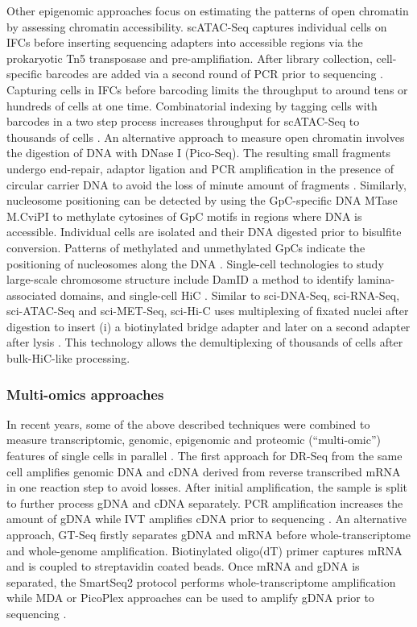 Other epigenomic approaches focus on estimating the patterns of open chromatin by assessing chromatin accessibility. \Gls{scATAC-Seq} captures individual cells on \glspl{IFC} before inserting sequencing adapters into accessible regions via the prokaryotic Tn5 transposase and pre-amplifiation. After library collection, cell-specific barcodes are added via a second round of PCR prior to sequencing \citep{Buenrostro2015}.  Capturing cells in IFCs before barcoding limits the throughput to around tens or hundreds of cells at one time. Combinatorial indexing by tagging cells with barcodes in a two step process increases throughput for scATAC-Seq to thousands of cells \citep{Cusanovich2015}. An alternative approach to measure open chromatin involves the digestion of DNA with DNase I (Pico-Seq). The resulting small fragments undergo end-repair, adaptor ligation and PCR amplification in the presence of circular carrier DNA to avoid the loss of minute amount of fragments \citep{Jin2015}. Similarly, nucleosome positioning can be detected by using the GpC-specific DNA \gls{MTase} M.CviPI to methylate cytosines of GpC motifs in regions where DNA is accessible. Individual cells are isolated and their DNA digested prior to bisulfite conversion. Patterns of methylated and unmethylated GpCs indicate the positioning of nucleosomes along the DNA \citep{Small2014}.
Single-cell technologies to study large-scale chromosome structure include \gls{DamID} \citep{Kind2015} a method to identify lamina-associated domains, and single-cell \gls{HiC} \citep{Nagano2013}. Similar to sci-DNA-Seq, sci-RNA-Seq, sci-ATAC-Seq and sci-MET-Seq, sci-Hi-C uses multiplexing of fixated nuclei after digestion to insert (i) a biotinylated bridge adapter and later on a second adapter after lysis \citep{Ramani2017}. This technology allows the demultiplexing of thousands of cells after bulk-HiC-like processing. 

\subsubsection{Multi-omics approaches}

In recent years, some of the above described techniques were combined to measure transcriptomic, genomic, epigenomic and proteomic (“multi-omic”) features of single cells in parallel \citep{Macaulay2017}. The first approach for \gls{DR-Seq} from the same cell amplifies genomic DNA and cDNA derived from reverse transcribed mRNA in one reaction step to avoid losses. After initial amplification, the sample is split to further process gDNA and cDNA separately. PCR amplification increases the amount of gDNA while IVT amplifies cDNA prior to sequencing \citep{Dey2015}. An alternative approach, \gls{GT-Seq} firstly separates gDNA and mRNA before whole-transcriptome and whole-genome amplification. Biotinylated oligo(dT) primer captures mRNA and is coupled to streptavidin coated beads. Once mRNA and gDNA is separated, the SmartSeq2 protocol performs whole-transcriptome amplification while MDA or PicoPlex approaches can be used to amplify gDNA prior to sequencing \citep{Macaulay2015}.\\

